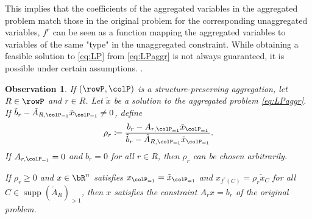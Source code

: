 \documentclass[smallextended,natbib]{svjour3}       %
\newcommand{\gr}[2][]{\todo[color=violet!40!,#1]{\textsf{GR:} #2}}
\newtheorem{observation}[theorem]{Observation}
\DeclareMathOperator{\supp}{supp}
\numberwithin{definition}{section}
\numberwithin{theorem}{section}
\numberwithin{proposition}{section}
\begin{document}
\vspace{0.5cm}
This implies that the coefficients of the aggregated variables in the aggregated problem match those
 in the original problem for the corresponding unaggregated variables, \(f^r\) can be seen as a 
 function mapping the aggregated variables to variables of the same "type" in the unaggregated
  constraint.
 While obtaining a feasible solution to \eqref{eq:LP} from \eqref{eq:LPaggr} is not always guaranteed,
  it is possible under certain assumptions.
.
\begin{observation}
\label{ob:aggrconstr}
If \((\rowP, \colP)\) is a structure-preserving aggregation, let \(R \in \rowP\) and \(r \in R\). Let \(\tilde{x}\) be a solution
 to the aggregated problem \eqref{eq:LPaggr}. 
If \(\tilde{b}_r - \tilde{A}_{R, \colP_{=1}} \tilde{x}_{\colP_{=1}} \neq 0\), define 
\[\rho_r \coloneqq \frac{b_r - A_{r, \colP_{=1}} \tilde{x}_{\colP_{=1}}}{\tilde{b}_r
 - \tilde{A}_{R, \colP_{=1}} \tilde{x}_{\colP_{=1}}}.\]
  If \(A_{r, \colP_{=1}} = 0\) and \(b_r = 0\) for all \(r \in R\), then \(\rho_r\) can be chosen arbitrarily. 

If \(\rho_r \geq 0\) and \(x \in \bR^n\) satisfies \(x_{\colP_{=1}} = \tilde{x}_{\colP_{=1}}\) and \(x_{f^r(C)} = \rho_r \tilde{x}_C\) for all \(C \in \supp(\tilde{A}_R)_{>1}\), then \(x\) satisfies the constraint \(A_r x = b_r\) of the original problem.
\end{observation}
\end{document}
